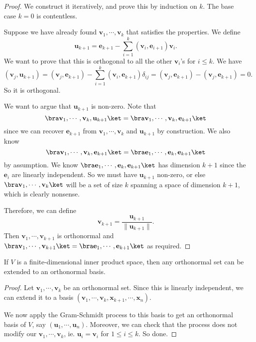\documentclass[a4paper]{article}
\begin{document}
\begin{proof}
  We construct it iteratively, and prove this by induction on $k$. The base case $k = 0$ is contentless.

  Suppose we have already found $\mathbf{v}_1, \cdots, \mathbf{v}_k$ that satisfies the properties. We define
  \[
    \mathbf{u}_{k + 1} = \mathbf{e}_{k + 1} - \sum_{i = 1}^k (\mathbf{v}_i, \mathbf{e}_{i + 1}) \mathbf{v}_i.
  \]
  We want to prove that this is orthogonal to all the other $\mathbf{v}_i$'s for $i \leq k$. We have
  \[
    (\mathbf{v}_j, \mathbf{u}_{k + 1}) = (\mathbf{v}_j, \mathbf{e}_{k + 1}) - \sum_{i = 1}^k (\mathbf{v}_i, \mathbf{e}_{k + 1}) \delta_{ij} = (\mathbf{v}_j, \mathbf{e}_{k + 1}) - (\mathbf{v}_j, \mathbf{e}_{k + 1}) = 0.
  \]
  So it is orthogonal.

  We want to argue that $\mathbf{u}_{k + 1}$ is non-zero. Note that
  \[
    \bra \mathbf{v}_1, \cdots, \mathbf{v}_k, \mathbf{u}_{k + 1}\ket = \bra \mathbf{v}_1, \cdots, \mathbf{v}_k, \mathbf{e}_{k + 1}\ket
  \]
  since we can recover $\mathbf{e}_{k + 1}$ from $\mathbf{v}_1, \cdots, \mathbf{v}_k$ and $\mathbf{u}_{k + 1}$ by construction. We also know
  \[
    \bra \mathbf{v}_1, \cdots, \mathbf{v}_k, \mathbf{e}_{k + 1}\ket = \bra \mathbf{e}_1, \cdots, \mathbf{e}_k, \mathbf{e}_{k + 1}\ket
  \]
  by assumption. We know $\bra \mathbf{e}_1, \cdots, \mathbf{e}_k, \mathbf{e}_{k + 1}\ket$ has dimension $k + 1$ since the $\mathbf{e}_i$ are linearly independent. So we must have $\mathbf{u}_{k + 1}$ non-zero, or else $\bra \mathbf{v}_1, \cdots, \mathbf{v}_k\ket$ will be a set of size $k$ spanning a space of dimension $k + 1$, which is clearly nonsense.

  Therefore, we can define
  \[
    \mathbf{v}_{k + 1} = \frac{\mathbf{u}_{k + 1}}{\|\mathbf{u}_{k + 1}\|}.
  \]
  Then $\mathbf{v}_1, \cdots, \mathbf{v}_{k + 1}$ is orthonormal and $\bra \mathbf{v}_1, \cdots, \mathbf{v}_{k + 1}\ket = \bra \mathbf{e}_1, \cdots, \mathbf{e}_{k + 1}\ket$ as required.
\end{proof}

\begin{cor}
  If $V$ is a finite-dimensional inner product space, then any orthonormal set can be extended to an orthonormal basis.
\end{cor}

\begin{proof}
  Let $\mathbf{v}_1, \cdots, \mathbf{v}_k$ be an orthonormal set. Since this is linearly independent, we can extend it to a basis $(\mathbf{v}_1,\cdots, \mathbf{v}_k, \mathbf{x}_{k + 1}, \cdots, \mathbf{x}_n)$.

  We now apply the Gram-Schmidt process to this basis to get an orthonormal basis of $V$, say $(\mathbf{u}_1, \cdots, \mathbf{u}_n)$. Moreover, we can check that the process does not modify our $\mathbf{v}_1, \cdots, \mathbf{v}_k$, ie. $\mathbf{u}_i = \mathbf{v}_i$ for $1 \leq i \leq k$. So done.
\end{proof}
\end{document}
